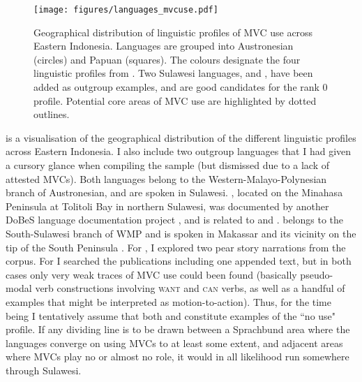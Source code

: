 \begin{figure}
\texttt{[image: figures/languages\_mvcuse.pdf]}
\caption[Geographical distribution of linguistic profiles of MVC use across Eastern Indonesia]{Geographical distribution of linguistic profiles of MVC use across Eastern Indonesia. Languages are grouped into Austronesian (circles) and Papuan (squares). The colours designate the four linguistic profiles from . Two Sulawesi languages,  and , have been added as outgroup examples, and are good candidates for the rank 0 profile. Potential core areas of MVC use are highlighted by dotted outlines.}\label{fig:map_profiles}
\end{figure}

 is a visualisation of the geographical distribution of the different linguistic profiles across Eastern Indonesia. I also include two outgroup languages that I had given a cursory glance when compiling the sample (but dismissed due to a lack of attested MVCs). Both languages belong to the Western-Malayo-Polynesian branch of Austronesian, and are spoken in Sulawesi. , located on the Minahasa Peninsula at Tolitoli Bay in northern Sulawesi, was documented by another DoBeS language documentation project \citep{leto2012totoli}, and is related to  and .  belongs to the South-Sulawesi branch of WMP and is spoken in Makassar and its vicinity on the tip of the South Peninsula \citep{jukes2005makassar, jukes2006makassarese}. For , I explored two pear story narrations from the  corpus. For  I searched the publications including one appended text, but in both cases only very weak traces of MVC use could been found (basically pseudo-modal verb constructions involving \textsc{want} and \textsc{can} verbs, as well as a handful of examples that might be interpreted as motion-to-action). Thus, for the time being I tentatively assume that both  and  constitute examples of the ``no use" profile. If any dividing line is to be drawn between a Sprachbund area where the languages converge on using MVCs to at least some extent, and adjacent areas where MVCs play no or almost no role, it would in all likelihood run somewhere through Sulawesi.

